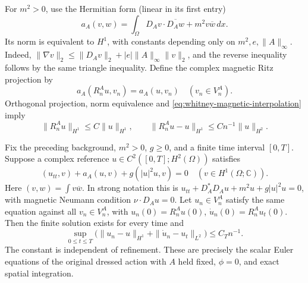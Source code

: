 For \(m^2>0\), use the Hermitian form (linear in its first entry)
\[
 a_A(v,w)=\int_\Omega D_Av\cdot\overline{D_Aw}
                         +m^2v\overline w\,dx.
\]
Its norm is equivalent to \(H^1\), with constants depending only
on \(m^2,e,\|A\|_\infty\). Indeed,
\(\|\nabla v\|_2\leq\|D_Av\|_2+|e|\|A\|_\infty\|v\|_2\),
and the reverse inequality follows by the same triangle inequality.
Define the complex magnetic Ritz projection by
\[
 a_A(R_n^Au,v_n)=a_A(u,v_n)\quad(v_n\in V_n^A).
\]
Orthogonal projection, norm equivalence and
\eqref{eq:whitney-magnetic-interpolation} imply
\begin{equation}
 \|R_n^Au\|_{H^1}\leq C\|u\|_{H^1},\qquad
 \|R_n^Au-u\|_{H^1}\leq Cn^{-1}\|u\|_{H^2}.
 \label{eq:whitney-magnetic-ritz}
\end{equation}

\begin{theorem}
\label{thm:whitney-magnetic-continuum-trajectory}
Fix the preceding background, \(m^2>0\), \(g\geq0\), and a
finite time interval \([0,T]\). Suppose a complex reference
\(u\in C^2([0,T];H^2(\Omega))\) satisfies
\begin{equation}
 (u_{tt},v)+a_A(u,v)+g(|u|^2u,v)=0
                   \quad(v\in H^1(\Omega;\mathbb C)).
 \label{eq:whitney-magnetic-continuum-reference}
\end{equation}
Here \((v,w)=\int v\overline w\). In strong notation this is
\(u_{tt}+D_A^*D_Au+m^2u+g|u|^2u=0\), with magnetic
Neumann condition \(\nu\cdot D_Au=0\). Let \(u_n\in V_n^A\)
satisfy the same equation against all \(v_n\in V_n^A\), with
\(u_n(0)=R_n^Au(0)\), \(\dot u_n(0)=R_n^Au_t(0)\).
Then the finite solution exists for every time and
\begin{equation}
 \sup_{0\leq t\leq T}
 \bigl(\|u_n-u\|_{H^1}+\|\dot u_n-u_t\|_{L^2}\bigr)
       \leq C_T n^{-1}.
 \label{eq:whitney-magnetic-trajectory-error}
\end{equation}
The constant is independent of refinement. These are precisely the
scalar Euler equations of the original dressed action with \(A\)
held fixed, \(\phi=0\), and exact spatial integration.
\end{theorem}
